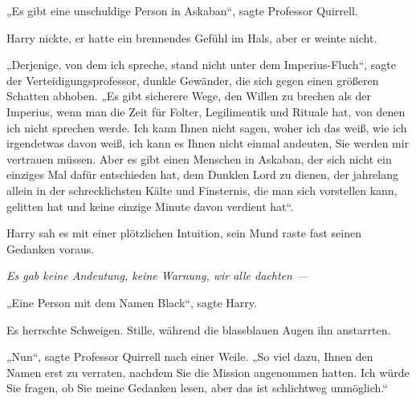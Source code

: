 „Es gibt eine unschuldige Person in Askaban“, sagte Professor Quirrell.

Harry nickte, er hatte ein brennendes Gefühl im Hals, aber er weinte nicht.

„Derjenige, von dem ich spreche, stand nicht unter dem Imperius-Fluch“, sagte der Verteidigungsprofessor, dunkle Gewänder, die sich gegen einen größeren Schatten abhoben.
„Es gibt sicherere Wege, den Willen zu brechen als der Imperius, wenn man die Zeit für Folter, Legilimentik und Rituale hat, von denen ich nicht sprechen werde. Ich kann Ihnen nicht sagen, woher ich das weiß, wie ich irgendetwas davon weiß, ich kann es Ihnen nicht einmal andeuten, Sie werden mir vertrauen müssen. Aber es gibt einen Menschen in Askaban, der sich nicht ein einziges Mal dafür entschieden hat, dem Dunklen Lord zu dienen, der jahrelang allein in der schrecklichsten Kälte und Finsternis, die man sich vorstellen kann, gelitten hat und keine einzige Minute davon verdient hat“.

Harry sah es mit einer plötzlichen Intuition, sein Mund raste fast seinen Gedanken voraus.

\emph{Es gab keine Andeutung, keine Warnung, wir alle dachten —}

„Eine Person mit dem Namen Black“, sagte Harry.

Es herrschte Schweigen. Stille, während die blassblauen Augen ihn anstarrten.

„Nun“, sagte Professor Quirrell nach einer Weile.
„So viel dazu, Ihnen den Namen erst zu verraten, nachdem Sie die Mission angenommen hatten. Ich würde Sie fragen, ob Sie meine Gedanken lesen, aber das ist schlichtweg unmöglich.“

